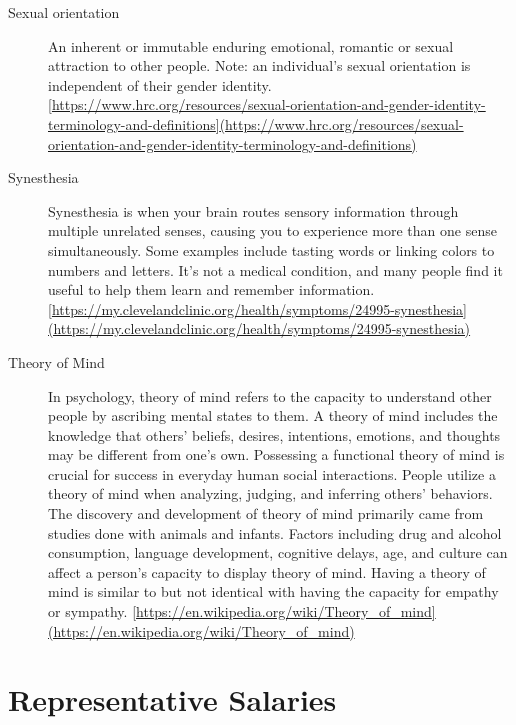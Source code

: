 \documentclass[
  letterpaper,
  DIV=11,
  numbers=noendperiod]{scrreprt}
\begin{document}
\begin{description}
\item[Sexual orientation]
An inherent or immutable enduring emotional, romantic or sexual
attraction to other people. Note: an individual's sexual orientation is
independent of their gender identity.
\href{https://www.hrc.org/resources/sexual-orientation-and-gender-identity-terminology-and-definitions\%5D(https://www.hrc.org/resources/sexual-orientation-and-gender-identity-terminology-and-definitions)}{{[}https://www.hrc.org/resources/sexual-orientation-and-gender-identity-terminology-and-definitions{]}(https://www.hrc.org/resources/sexual-orientation-and-gender-identity-terminology-and-definitions)}
\item[Synesthesia]
Synesthesia is when your brain routes sensory information through
multiple unrelated senses, causing you to experience more than one sense
simultaneously. Some examples include tasting words or linking colors to
numbers and letters. It's not a medical condition, and many people find
it useful to help them learn and remember information.
\href{https://my.clevelandclinic.org/health/symptoms/24995-synesthesia\%5D(https://my.clevelandclinic.org/health/symptoms/24995-synesthesia)}{{[}https://my.clevelandclinic.org/health/symptoms/24995-synesthesia{]}(https://my.clevelandclinic.org/health/symptoms/24995-synesthesia)}
\item[Theory of Mind]
In psychology, theory of mind refers to the capacity to understand other
people by ascribing mental states to them. A theory of mind includes the
knowledge that others' beliefs, desires, intentions, emotions, and
thoughts may be different from one's own. Possessing a functional theory
of mind is crucial for success in everyday human social interactions.
People utilize a theory of mind when analyzing, judging, and inferring
others' behaviors. The discovery and development of theory of mind
primarily came from studies done with animals and infants. Factors
including drug and alcohol consumption, language development, cognitive
delays, age, and culture can affect a person's capacity to display
theory of mind. Having a theory of mind is similar to but not identical
with having the capacity for empathy or sympathy.
\href{https://en.wikipedia.org/wiki/Theory_of_mind\%5D(https://en.wikipedia.org/wiki/Theory_of_mind)}{{[}https://en.wikipedia.org/wiki/Theory\_of\_mind{]}(https://en.wikipedia.org/wiki/Theory\_of\_mind)}
\end{description}

\chapter{Representative Salaries}\label{sec-representative-salaries}
\end{document}
